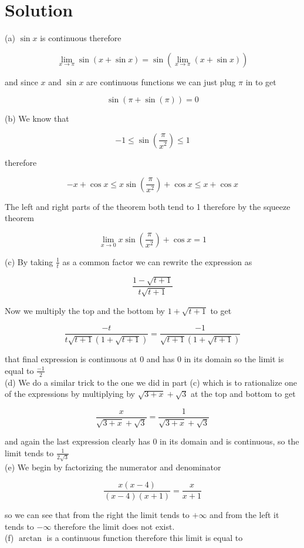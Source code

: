 \documentclass[10pt]{article}
\begin{document}
\section*{Solution}
(a) $\sin x$ is continuous therefore

$$
\lim _{x \rightarrow \pi} \sin (x+\sin x)=\sin \left(\lim _{x \rightarrow \pi}(x+\sin x)\right)
$$

and since $x$ and $\sin x$ are continuous functions we can just plug $\pi$ in to get

$$
\sin (\pi+\sin (\pi))=0
$$

(b) We know that

$$
-1 \leq \sin \left(\frac{\pi}{x^{2}}\right) \leq 1
$$

therefore

$$
-x+\cos x \leq x \sin \left(\frac{\pi}{x^{2}}\right)+\cos x \leq x+\cos x
$$

The left and right parts of the theorem both tend to 1 therefore by the squeeze theorem

$$
\lim _{x \rightarrow 0} x \sin \left(\frac{\pi}{x^{2}}\right)+\cos x=1
$$

(c) By taking $\frac{1}{t}$ as a common factor we can rewrite the expression as

$$
\frac{1-\sqrt{t+1}}{t \sqrt{t+1}}
$$

Now we multiply the top and the bottom by $1+\sqrt{t+1}$ to get

$$
\frac{-t}{t \sqrt{t+1}(1+\sqrt{t+1})}=\frac{-1}{\sqrt{t+1}(1+\sqrt{t+1})}
$$

that final expression is continuous at 0 and has 0 in its domain so the limit is equal to $\frac{-1}{2}$\\
(d) We do a similar trick to the one we did in part (c) which is to rationalize one of the expressions by multiplying by $\sqrt{3+x}+\sqrt{3}$ at the top and bottom to get

$$
\frac{x}{\sqrt{3+x}+\sqrt{3}}=\frac{1}{\sqrt{3+x}+\sqrt{3}}
$$

and again the last expression clearly has 0 in its domain and is continuous, so the limit tends to $\frac{1}{2 \sqrt{3}}$\\
(e) We begin by factorizing the numerator and denominator

$$
\frac{x(x-4)}{(x-4)(x+1)}=\frac{x}{x+1}
$$

so we can see that from the right the limit tends to $+\infty$ and from the left it tends to $-\infty$ therefore the limit does not exist.\\
(f) $\arctan$ is a continuous function therefore this limit is equal to
\end{document}
